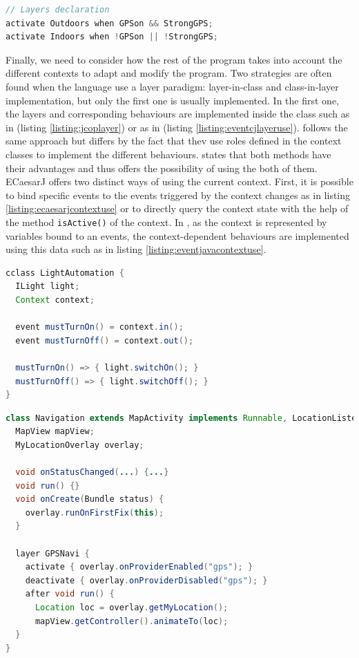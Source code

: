\documentclass[a4paper]{article}
\begin{document}
\begin{lstlisting}[float, language=Java, caption=Javanese context declaration, label={listing:javaneselayer}]
// Layers declaration
activate Outdoors when GPSon && StrongGPS;
activate Indoors when !GPSon || !StrongGPS;
\end{lstlisting}

Finally, we need to consider how the rest of the program takes into account the different contexts to adapt and modify the program. Two strategies are often found when the language use a layer paradigm: layer-in-class and class-in-layer implementation, but only the first one is usually implemented. In the first one, the layers and corresponding behaviours are implemented inside the class such as in \cite{appeltauer_improving_2009} \cite{appeltauer_declarative_2013} \cite{wasty_contextlua:_2010} (listing \ref{listing:jcoplayer}) or as in \cite{kamina_eventcj:_2011} \cite{kamina_unified_2013} (listing \ref{listing:eventcjlayeruse}). \cite{kamina_towards_2009} follows the same approach but differs by the fact that thev use roles defined in the context classes to implement the different behaviours. \cite{ghezzi_context_2010} states that both methods have their advantages and thus offers the possibility of using the both of them. ECaesarJ offers two distinct ways of using the current context. First, it is possible to bind specific events to the events triggered by the context changes as in listing \ref{listing:ecaesarjcontextuse} or to directly query the context state with the help of the method \lstinline|isActive()| of the context. In \cite{jayaram_context-oriented_2009}, as the context is represented by variables bound to an events, the context-dependent behaviours are implemented using this data such as in listing \ref{listing:eventjavacontextuse}.

\begin{lstlisting}[float, language=Java, caption=ECaesarJ context use, label={listing:ecaesarjcontextuse}]
cclass LightAutomation {
  ILight light;
  Context context;

  event mustTurnOn() = context.in();
  event mustTurnOff() = context.out();

  mustTurnOn() => { light.switchOn(); }
  mustTurnOff() => { light.switchOff(); }
}
\end{lstlisting}

\begin{lstlisting}[float, language=Java, caption=EventCJ context-dependent behaviour, label={listing:eventcjlayeruse}]
class Navigation extends MapActivity implements Runnable, LocationListener {
  MapView mapView;
  MyLocationOverlay overlay;
    
  void onStatusChanged(...) {...}
  void run() {}
  void onCreate(Bundle status) {
    overlay.runOnFirstFix(this);
  }
  
  layer GPSNavi {
    activate { overlay.onProviderEnabled("gps"); }
    deactivate { overlay.onProviderDisabled("gps"); }
    after void run() {
      Location loc = overlay.getMyLocation();
      mapView.getController().animateTo(loc);
  }
}
\end{lstlisting}
\end{document}
